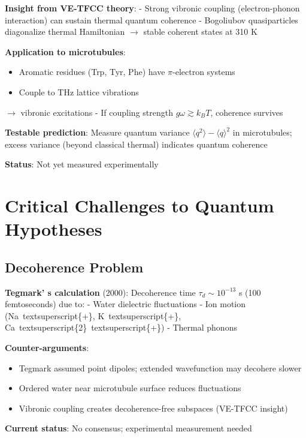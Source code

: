 \textbf{Insight from VE-TFCC theory}: - Strong vibronic coupling
(electron-phonon interaction) can sustain thermal quantum coherence -
Bogoliubov quasiparticles diagonalize thermal Hamiltonian
$\rightarrow$ stable coherent states at 310 K

\textbf{Application to microtubules}:
\begin{itemize}
\item Aromatic residues (Trp, Tyr,
Phe) have \(\pi\)-electron systems
\item Couple to THz lattice vibrations
\end{itemize}

$\rightarrow$ vibronic excitations - If coupling
strength \(g \omega \gtrsim k_B T\), coherence survives

\textbf{Testable prediction}: Measure quantum variance
\(\langle q^2 \rangle - \langle q \rangle^2\) in microtubules; excess
variance (beyond classical thermal) indicates quantum coherence

\textbf{Status}: Not yet measured experimentally

\section{Critical Challenges to Quantum Hypotheses}
\label{sec:critical-challenges}

\subsection{Decoherence Problem}\label{decoherence-problem}

\textbf{Tegmark' s calculation} (2000): Decoherence time
\(\tau_d \sim 10^{-13}\) s (100 femtoseconds) due to: - Water dielectric
fluctuations - Ion motion (Na\ textsuperscript\{+\},
K\ textsuperscript\{+\},
Ca\ textsuperscript\{2\}\ textsuperscript\{+\})
- Thermal phonons

\textbf{Counter-arguments}:
\begin{itemize}
\item Tegmark assumed point dipoles; extended
wavefunction may decohere slower
\item Ordered water near microtubule
surface reduces fluctuations
\item Vibronic coupling creates
decoherence-free subspaces (VE-TFCC insight)
\end{itemize}


\textbf{Current status}: No consensus; experimental measurement needed

